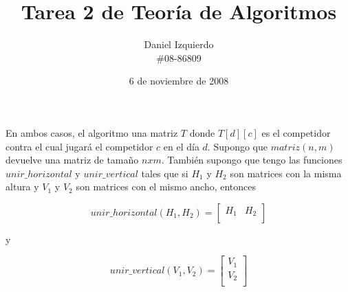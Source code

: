 \documentclass{article}
\begin{document}

\title{Tarea 2 de Teoría de Algoritmos}
\author{Daniel Izquierdo \\ \#08-86809}
\date{6 de noviembre de 2008}

\maketitle

\section{}

\section{}

En ambos casos, el algoritmo una matriz $T$ donde $T[d][c]$
es el competidor contra el cual
jugará el competidor $c$ en el día $d$.
Supongo que
$matriz(n,m)$ devuelve una matriz de tamaño $n x m$. También supongo que tengo las funciones
$unir\_horizontal$ y $unir\_vertical$ tales que si $H_1$ y $H_2$ son matrices con la misma altura
y $V_1$ y $V_2$ son matrices con el mismo ancho, entonces

$$
unir\_horizontal(H_1, H_2) = \left[
\begin{array}{cc}
H_1 & H_2 \\
\end{array}
\right]
$$

y

$$
unir\_vertical(V_1, V_2) = \left[
\begin{array}{c}
V_1 \\
V_2 \\
\end{array}
\right]
$$
\end{document}
